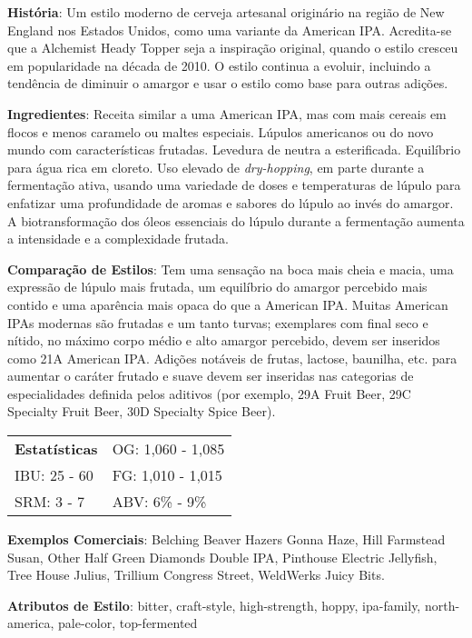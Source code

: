 \textbf{História}: Um estilo moderno de cerveja artesanal originário na região de New England nos Estados Unidos, como uma variante da American IPA. Acredita-se que a Alchemist Heady Topper seja a inspiração original, quando o estilo cresceu em popularidade na década de 2010. O estilo continua a evoluir, incluindo a tendência de diminuir o amargor e usar o estilo como base para outras adições.

\textbf{Ingredientes}: Receita similar a uma American IPA, mas com mais cereais em flocos e menos caramelo ou maltes especiais. Lúpulos americanos ou do novo mundo com características frutadas. Levedura de neutra a esterificada. Equilíbrio para água rica em cloreto. Uso elevado de \textit{dry-hopping}, em parte durante a fermentação ativa, usando uma variedade de doses e temperaturas de lúpulo para enfatizar uma profundidade de aromas e sabores do lúpulo ao invés do amargor. A biotransformação dos óleos essenciais do lúpulo durante a fermentação aumenta a intensidade e a complexidade frutada.

\textbf{Comparação de Estilos}: Tem uma sensação na boca mais cheia e macia, uma expressão de lúpulo mais frutada, um equilíbrio do amargor percebido mais contido e uma aparência mais opaca do que a American IPA. Muitas American IPAs modernas são frutadas e um tanto turvas; exemplares com final seco e nítido, no máximo corpo médio e alto amargor percebido, devem ser inseridos como 21A American IPA. Adições notáveis de frutas, lactose, baunilha, etc. para aumentar o caráter frutado e suave devem ser inseridas nas categorias de especialidades definida pelos aditivos (por exemplo, 29A Fruit Beer, 29C Specialty Fruit Beer, 30D Specialty Spice Beer).

\begin{tabular}{@{}p{35mm}p{35mm}@{}}
  \textbf{Estatísticas} & OG: 1,060 - 1,085 \\
  IBU: 25 - 60  & FG: 1,010 - 1,015 \\
  SRM: 3 - 7  & ABV: 6\% - 9\%
\end{tabular}

\textbf{Exemplos Comerciais}: Belching Beaver Hazers Gonna Haze, Hill Farmstead Susan, Other Half Green Diamonds Double IPA, Pinthouse Electric Jellyfish, Tree House Julius, Trillium Congress Street, WeldWerks Juicy Bits.

\textbf{Atributos de Estilo}: bitter, craft-style, high-strength, hoppy, ipa-family, north-america, pale-color, top-fermented
